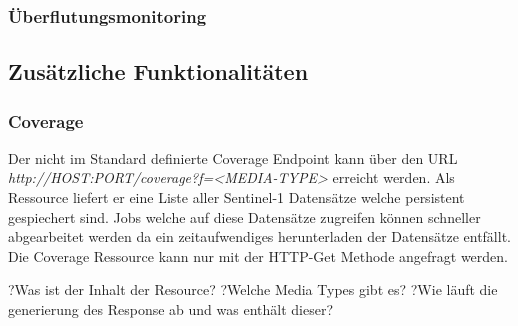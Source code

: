 \subsubsection{Überflutungsmonitoring}
\subsection{Zusätzliche Funktionalitäten}
\subsubsection{Coverage} 
Der nicht im Standard definierte Coverage Endpoint kann über den URL \textit{http://HOST:PORT/coverage?f=<MEDIA-TYPE>} erreicht werden. Als Ressource liefert er eine Liste aller Sentinel-1 Datensätze welche persistent gespiechert sind. 
Jobs welche auf diese Datensätze zugreifen können schneller abgearbeitet werden da ein zeitaufwendiges herunterladen der Datensätze entfällt. Die Coverage Ressource kann nur mit der HTTP-Get Methode angefragt werden. 

?Was ist der Inhalt der Resource?
?Welche Media Types gibt es?
?Wie läuft die generierung des Response ab und was enthält dieser?